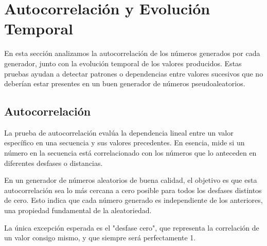 \documentclass{article}
\begin{document}
\section{Autocorrelación y Evolución Temporal}

En esta sección analizamos la autocorrelación de los números generados por cada generador, junto con la evolución temporal de los valores producidos. Estas pruebas ayudan a detectar patrones o dependencias entre valores sucesivos que no deberían estar presentes en un buen generador de números pseudoaleatorios.

\subsection{Autocorrelación}

La prueba de autocorrelación evalúa la dependencia lineal entre un valor específico en una secuencia y sus valores precedentes. En esencia, mide si un número en la secuencia está correlacionado con los números que lo anteceden en diferentes desfases o distancias.

En un generador de números aleatorios de buena calidad, el objetivo es que esta autocorrelación sea lo más cercana a cero posible para todos los desfases distintos de cero. Esto indica que cada número generado es independiente de los anteriores, una propiedad fundamental de la aleatoriedad.

La única excepción esperada es el "desfase cero", que representa la correlación de un valor consigo mismo, y que siempre será perfectamente 1.

\newpage
\end{document}
